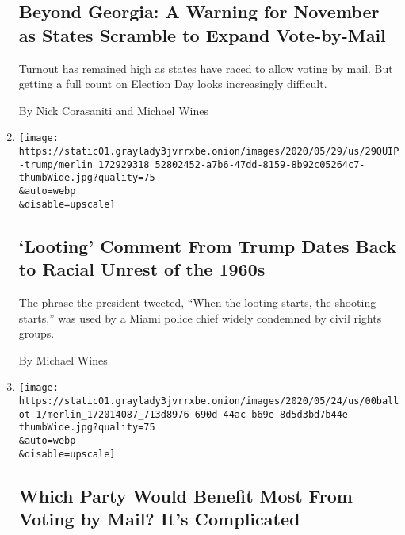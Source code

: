 \begin{enumerate}
  \hypertarget{beyond-georgia-a-warning-for-november-as-states-scramble-to-expand-vote-by-mail}{%
  \subsection{Beyond Georgia: A Warning for November as States Scramble
  to Expand
  Vote-by-Mail}\label{beyond-georgia-a-warning-for-november-as-states-scramble-to-expand-vote-by-mail}}

  Turnout has remained high as states have raced to allow voting by
  mail. But getting a full count on Election Day looks increasingly
  difficult.

  By Nick Corasaniti and Michael Wines
\item
  \href{/2020/05/29/us/looting-starts-shooting-starts.html}{}

  \texttt{[image: https://static01.graylady3jvrrxbe.onion/images/2020/05/29/us/29QUIP-trump/merlin\_172929318\_52802452-a7b6-47dd-8159-8b92c05264c7-thumbWide.jpg?quality=75\\\&auto=webp\\\&disable=upscale]}

  \hypertarget{looting-comment-from-trump-dates-back-to-racial-unrest-of-the-1960s}{%
  \subsection{`Looting' Comment From Trump Dates Back to Racial Unrest
  of the
  1960s}\label{looting-comment-from-trump-dates-back-to-racial-unrest-of-the-1960s}}

  The phrase the president tweeted, ``When the looting starts, the
  shooting starts,'' was used by a Miami police chief widely condemned
  by civil rights groups.

  By Michael Wines
\item
  \href{/2020/05/25/us/vote-by-mail-coronavirus.html}{}

  \texttt{[image: https://static01.graylady3jvrrxbe.onion/images/2020/05/24/us/00ballot-1/merlin\_172014087\_713d8976-690d-44ac-b69e-8d5d3bd7b44e-thumbWide.jpg?quality=75\\\&auto=webp\\\&disable=upscale]}

  \hypertarget{which-party-would-benefit-most-from-voting-by-mail-its-complicated}{%
  \subsection{Which Party Would Benefit Most From Voting by Mail? It's
  Complicated}\label{which-party-would-benefit-most-from-voting-by-mail-its-complicated}}


\end{enumerate}
